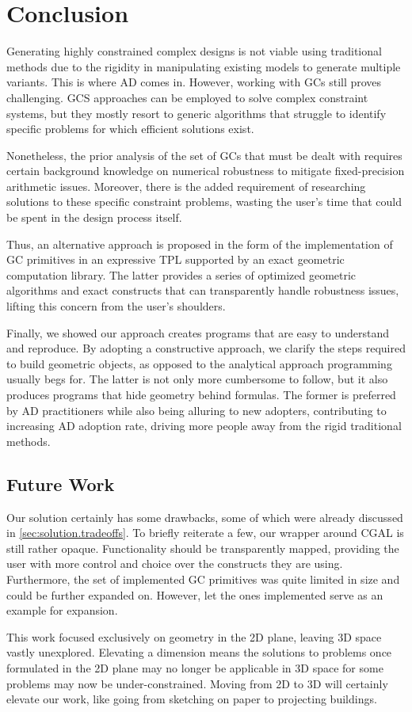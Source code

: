 \section{Conclusion}%
\label{sec:conclusion}

Generating highly constrained complex designs is not viable using traditional
methods due to the rigidity in manipulating existing models to generate multiple
variants.  This is where \ac{AD} comes in.  However, working with \acp{GC} still
proves challenging.  \Ac{GCS} approaches can be employed to solve complex
constraint systems, but they mostly resort to generic algorithms that struggle
to identify specific problems for which efficient solutions exist.

Nonetheless, the prior analysis of the set of \acp{GC} that must be dealt with
requires certain background knowledge on numerical robustness to mitigate
fixed-precision arithmetic issues.  Moreover, there is the added requirement of
researching solutions to these specific constraint problems,  wasting the user's
time that could be spent in the design process itself.

Thus, an alternative approach is proposed in the form of the implementation of
\ac{GC} primitives in an expressive \ac{TPL} supported by an exact geometric
computation library.  The latter provides a series of optimized geometric
algorithms and exact constructs that can transparently handle robustness issues,
lifting this concern from the user's shoulders.

Finally, we showed our approach creates programs that are easy to understand and
reproduce.  By adopting a constructive approach, we clarify the steps required
to build geometric objects, as opposed to the analytical approach programming
usually begs for.  The latter is not only more cumbersome to follow, but it also
produces programs that hide geometry behind formulas.  The former is preferred
by \ac{AD} practitioners while also being alluring to new adopters, contributing
to increasing \ac{AD} adoption rate, driving more people away from the rigid
traditional methods.

\subsection*{Future Work}

Our solution certainly has some drawbacks, some of which were already discussed
in \cref{sec:solution.tradeoffs}.  To briefly reiterate a few, our wrapper
around \ac{CGAL} is still rather opaque.  Functionality should be transparently
mapped, providing the user with more control and choice over the constructs they
are using.  Furthermore, the set of implemented \ac{GC} primitives was quite
limited in size and could be further expanded on.  However, let the ones
implemented serve as an example for expansion.

This work focused exclusively on geometry in the 2D plane, leaving 3D space
vastly unexplored.  Elevating a dimension means the solutions to problems once
formulated in the 2D plane may no longer be applicable in 3D space for some
problems may now be under-constrained.  Moving from 2D to 3D will certainly
elevate our work, like going from sketching on paper to projecting buildings.
